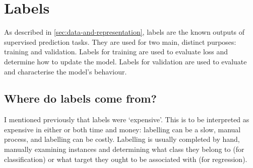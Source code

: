 \section{Labels}
\label{sec:labels}
    
    As described in \autoref{sec:data-and-representation}, labels are the known outputs of supervised prediction tasks. They are used for two main, distinct purposes: training and validation. Labels for training are used to evaluate loss and determine how to update the model. Labels for validation are used to evaluate and characterise the model's behaviour.

    \subsection{Where do labels come from?}
    \label{sec:sources-of-labels}

        I mentioned previously that labels were `expensive'. This is to be interpreted as expensive in either or both time and money: labelling can be a slow, manual process, and labelling can be costly. Labelling is usually completed by hand, manually examining instances and determining what class they belong to (for classification) or what target they ought to be associated with (for regression).

        \todo{}

